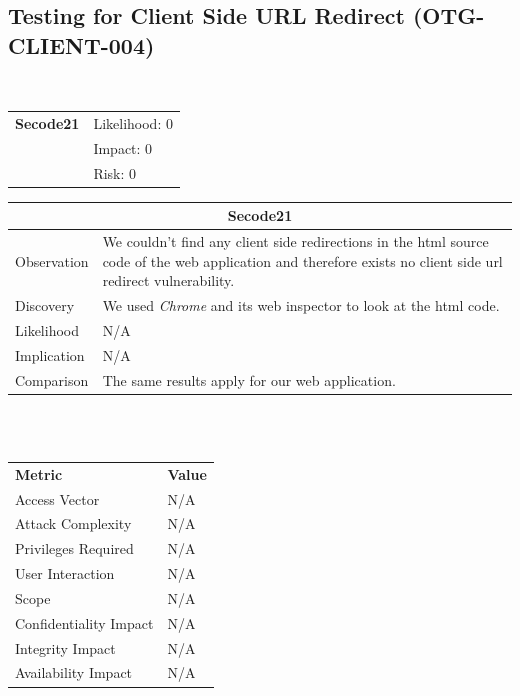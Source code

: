 \documentclass[headsepline,footsepline,footinclude=false,oneside,fontsize=11pt,paper=a4,listof=totoc,bibliography=totoc]{scrbook} %
\begin{document}
\subsection{Testing for Client Side URL Redirect (OTG-CLIENT-004)}\
\begin{tabular}{cR{12cm}}
	\textbf{Secode21} & Likelihood: 0\\& Impact: 0\\& Risk: 0
\end{tabular}

\begin{tabular}{ l|p{11cm}  }
	\hline
	\multicolumn{2}{c}{\textbf{Secode21}} \\
	\hline
	Observation   & We couldn't find any client side redirections in the html source code of the web application and therefore exists no client side url redirect vulnerability. \\
	Discovery  & We used \textit{Chrome} and its web inspector to look at the html code. \\
	Likelihood & N/A \\
	Implication    & N/A \\
	Comparison & The same results apply for our web application. \\
	\hline
\end{tabular}
\\
\vspace{0.5cm}
\\
\begin{center}
	\begin{tabular}{ll}
		\rowcolor[HTML]{34CDF9}
		{\color[HTML]{ECF4FF} \textbf{Metric}}        & {\color[HTML]{ECF4FF} \textbf{Value}} \\
		\rowcolor[HTML]{BBDAFF}
		{\color[HTML]{333333} Access Vector}          & {\color[HTML]{333333} } N/A              \\
		\rowcolor[HTML]{ECF4FF}
		{\color[HTML]{333333} Attack Complexity}      & {\color[HTML]{333333} } N/A              \\
		\rowcolor[HTML]{BBDAFF}
		{\color[HTML]{333333} Privileges Required}    & {\color[HTML]{333333} } N/A              \\
		\rowcolor[HTML]{ECF4FF}
		{\color[HTML]{333333} User Interaction}       & {\color[HTML]{333333} } N/A              \\
		\rowcolor[HTML]{BBDAFF}
		{\color[HTML]{333333} Scope}                  & {\color[HTML]{333333} } N/A              \\
		\rowcolor[HTML]{ECF4FF}
		{\color[HTML]{333333} Confidentiality Impact} & {\color[HTML]{333333} } N/A              \\
		\rowcolor[HTML]{BBDAFF}
		{\color[HTML]{333333} Integrity Impact}       & {\color[HTML]{333333} } N/A              \\
		\rowcolor[HTML]{ECF4FF}
		{\color[HTML]{333333} Availability Impact}    & {\color[HTML]{333333} } N/A
	\end{tabular}
\end{center}
\pagebreak
\end{document}
